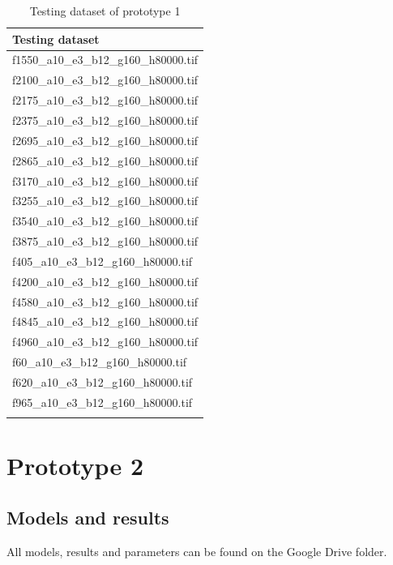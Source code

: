 \documentclass[12pt, twoside]{article}
\begin{document}
\begin{appendices}
	\begin{longtable}{|l|}
		\hline
		Testing dataset \\ \hline 
		f1550\_a10\_e3\_b12\_g160\_h80000.tif \\ \hline 
		f2100\_a10\_e3\_b12\_g160\_h80000.tif \\ \hline 
		f2175\_a10\_e3\_b12\_g160\_h80000.tif \\ \hline 
		f2375\_a10\_e3\_b12\_g160\_h80000.tif \\ \hline 
		f2695\_a10\_e3\_b12\_g160\_h80000.tif \\ \hline 
		f2865\_a10\_e3\_b12\_g160\_h80000.tif \\ \hline 
		f3170\_a10\_e3\_b12\_g160\_h80000.tif \\ \hline 
		f3255\_a10\_e3\_b12\_g160\_h80000.tif \\ \hline 
		f3540\_a10\_e3\_b12\_g160\_h80000.tif \\ \hline 
		f3875\_a10\_e3\_b12\_g160\_h80000.tif \\ \hline 
		f405\_a10\_e3\_b12\_g160\_h80000.tif \\ \hline 
		f4200\_a10\_e3\_b12\_g160\_h80000.tif \\ \hline 
		f4580\_a10\_e3\_b12\_g160\_h80000.tif \\ \hline 
		f4845\_a10\_e3\_b12\_g160\_h80000.tif \\ \hline 
		f4960\_a10\_e3\_b12\_g160\_h80000.tif \\ \hline 
		f60\_a10\_e3\_b12\_g160\_h80000.tif \\ \hline 
		f620\_a10\_e3\_b12\_g160\_h80000.tif \\ \hline 
		f965\_a10\_e3\_b12\_g160\_h80000.tif \\ \hline
		\caption{Testing dataset of prototype 1}
		\label{proto1_test}
	\end{longtable}

	
	\section{Prototype 2}
	\subsection{Models and results}
	All models, results and parameters can be found on the Google Drive folder.
	

\end{appendices}
\end{document}

